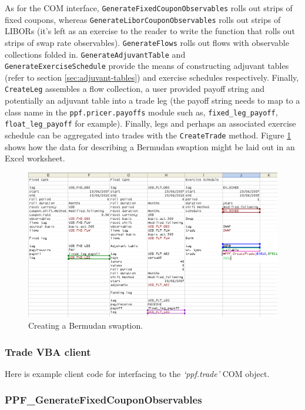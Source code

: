 As for the COM interface, \verb|GenerateFixedCouponObservables| rolls
out strips of fixed coupons, whereas
\verb|GenerateLiborCouponObservables| rolls out strips of LIBORs (it's
left as an exercise to the reader to write the function that rolls out
strips of swap rate observables). \verb|GenerateFlows| rolls out flows
with observable collections folded in. \verb|GenerateAdjuvantTable|
and \\
\verb|GenerateExerciseSchedule| provide the means of constructing
adjuvant tables (refer to section \ref{sec:adjuvant-tables}) and
exercise schedules respectively. Finally, \verb|CreateLeg| assembles a
flow collection, a user provided payoff string and potentially an
adjuvant table into a trade leg (the payoff string needs to map to a
class name in the \verb|ppf.pricer.payoffs| module
such as, \verb|fixed_leg_payoff|, \verb|float_leg_payoff| for
example). Finally, legs and perhaps an associated exercise schedule
can be aggregated into trades with the \verb|CreateTrade| method. Figure
\ref{fig:create-trade} shows how the data for describing a Bermudan
swaption might be laid out in an Excel worksheet.
\begin{figure} 
\centering
\includegraphics[scale=0.4]{img/trade_server.PNG}
\caption{Creating a Bermudan swaption.}
\label{fig:create-trade}
\end{figure}

\subsubsection{Trade VBA client}

Here is example client code for interfacing to the
\emph{`ppf.trade'} COM object.

\subsubsection{PPF\_GenerateFixedCouponObservables}


